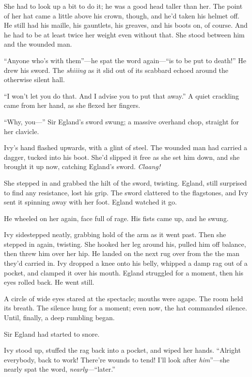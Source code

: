 She had to look up a bit to do it; he was a good head taller than her.
The point of her hat came a little above his crown, though, and he'd taken his helmet off.
He still had his maille, his gauntlets, his greaves, and his boots on, of course.
And he had to be at least twice her weight even without that.
She stood between him and the wounded man.

``Anyone who's with them''---he spat the word again---``is to be put to death!''
He drew his sword.
The \emph{shiiing} as it slid out of its scabbard echoed around the otherwise silent hall.

``I won't let you do that.
And I advise you to put that away.''
A quiet crackling came from her hand, as she flexed her fingers.

``Why, you---''
Sir Egland's sword swung; a massive overhand chop, straight for her clavicle.

Ivy's hand flashed upwards, with a glint of steel.
The wounded man had carried a dagger, tucked into his boot.
She'd slipped it free as she set him down, and she brought it up now, catching Egland's sword.
\emph{Claang!}

She stepped in and grabbed the hilt of the sword, twisting.
Egland, still surprised to find any resistance, lost his grip.
The sword clattered to the flagstones, and Ivy sent it spinning away with her foot.
Egland watched it go.

He wheeled on her again, face full of rage.
His fists came up, and he swung.

Ivy sidestepped neatly, grabbing hold of the arm as it went past.
Then she stepped in again, twisting.
She hooked her leg around his, pulled him off balance, then threw him over her hip.
He landed on the next rug over from the the man they'd carried in.
Ivy dropped a knee onto his belly, whipped a damp rag out of a pocket, and clamped it over his mouth.
Egland struggled for a moment, then his eyes rolled back.
He went still.

A circle of wide eyes stared at the spectacle; mouths were agape.
The room held its breath.
The silence hung for a moment; even now, the hat commanded silence.
Until, finally, a deep rumbling began.

Sir Egland had started to snore.

Ivy stood up, stuffed the rag back into a pocket, and wiped her hands.
``Alright everybody, back to work!
There're wounds to tend!
I'll look after \emph{him}''---she nearly spat the word, \emph{nearly}---``later.''

